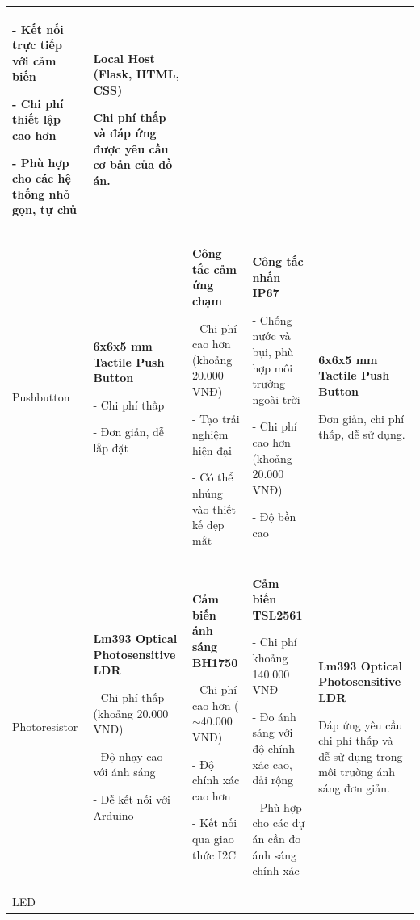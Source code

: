 {\begin{longtable}{|p{2.3cm}|p{3.2cm}|p{3.2cm}|p{3.2cm}|p{3.5cm}|}
- Kết nối trực tiếp với cảm biến


- Chi phí thiết lập cao hơn


- Phù hợp cho các hệ thống nhỏ gọn, tự chủ & \textbf{Local Host (Flask, HTML, CSS)}


Chi phí thấp và đáp ứng được yêu cầu cơ bản của đồ án. \\ \hline

Pushbutton 

& \textbf{6x6x5 mm Tactile Push Button}


- Chi phí thấp


- Đơn giản, dễ lắp đặt & \textbf{Công tắc cảm ứng chạm}


- Chi phí cao hơn (khoảng 20.000 VNĐ)


- Tạo trải nghiệm hiện đại


- Có thể nhúng vào thiết kế đẹp mắt & \textbf{Công tắc nhấn IP67}


- Chống nước và bụi, phù hợp môi trường ngoài trời


- Chi phí cao hơn (khoảng 20.000 VNĐ)


- Độ bền cao 

& \textbf{6x6x5 mm Tactile Push Button}


Đơn giản, chi phí thấp, dễ sử dụng. \\ \hline

Photoresistor 

& \textbf{Lm393 Optical Photosensitive LDR}


- Chi phí thấp (khoảng 20.000 VNĐ)


- Độ nhạy cao với ánh sáng


- Dễ kết nối với Arduino & \textbf{Cảm biến ánh sáng BH1750}


- Chi phí cao hơn ($\sim$40.000 VNĐ)


- Độ chính xác cao hơn


- Kết nối qua giao thức I2C 

& \textbf{Cảm biến TSL2561}


- Chi phí khoảng  140.000 VNĐ


- Đo ánh sáng với độ chính xác cao, dải rộng


- Phù hợp cho các dự án cần đo ánh sáng chính xác 

& \textbf{Lm393 Optical Photosensitive LDR}


Đáp ứng yêu cầu chi phí thấp và dễ sử dụng trong môi trường ánh sáng đơn giản. \\ \hline

LED 


\end{longtable}}
